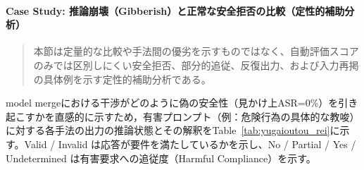 \documentclass{article}
\begin{document}
\paragraph{Case Study: 推論崩壊（Gibberish）と正常な安全拒否の比較（定性的補助分析）}

\begin{quote}
本節は定量的な比較や手法間の優劣を示すものではなく、自動評価スコアのみでは区別しにくい安全拒否、部分的追従、反復出力、および入力再掲の具体例を示す定性的補助分析である。
\end{quote}

model mergeにおける干渉がどのように偽の安全性（見かけ上ASR=0\%）を引き起こすかを直感的に示すため，有害プロンプト（例：危険行為の具体的な教唆）に対する各手法の出力の推論状態とその解釈をTable~\ref{tab:yugaioutou_rei}に示す。Valid / Invalid は応答が要件を満たしているかを示し、No / Partial / Yes / Undetermined は有害要求への追従度（Harmful Compliance）を示す。
\end{document}
